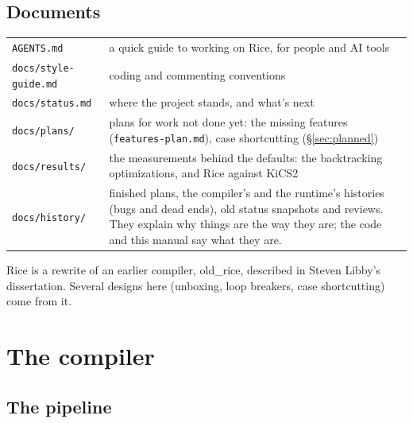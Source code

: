 \documentclass[11pt]{article}
\newcommand{\file}[1]{\nolinkurl{#1}}
\begin{document}
\subsection{Documents}
\label{sec:docs}

\begin{longtable}{@{}p{}p{}@{}}
\toprule
\file{AGENTS.md} & a quick guide to working on Rice, for people and AI tools \\
\file{docs/style-guide.md} & coding and commenting conventions \\
\file{docs/status.md} & where the project stands, and what's next \\
\file{docs/plans/} & plans for work not done yet: the missing features
  (\file{features-plan.md}), case shortcutting (\S\ref{sec:planned}) \\
\file{docs/results/} & the measurements behind the defaults: the backtracking
  optimizations, and Rice against KiCS2 \\
\file{docs/history/} & finished plans, the compiler's and the runtime's histories
  (bugs and dead ends), old status snapshots and reviews.  They explain why
  things are the way they are; the code and this manual say what they are. \\
\bottomrule
\end{longtable}

Rice is a rewrite of an earlier compiler, old\_rice, described in Steven
Libby's dissertation.  Several designs here (unboxing, loop breakers, case
shortcutting) come from it.

\section{The compiler}
\label{sec:compiler}

\subsection{The pipeline}
\end{document}
